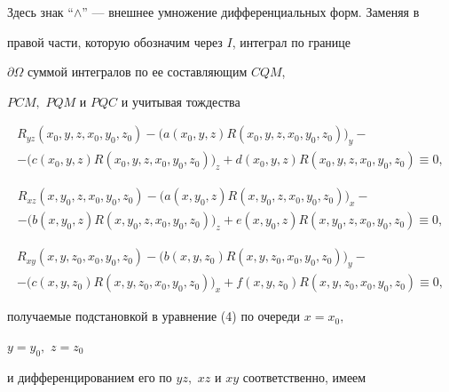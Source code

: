 \begin{pf}
Здесь знак ``$\wedge$'' --- внешнее умножение дифференциальных форм. Заменяя в


правой части, которую обозначим через $I$, интеграл по границе


$\partial\Omega$ суммой интегралов по ее составляющим $CQM$,


$PCM,$ $PQM$ и $PQC$ и учитывая тождества


\begin{multline*}


R_{yz}(x_{0},y,z,x_{0},y_{0},z_{0})-\bigl(


a(x_{0},y,z)R(x_{0},y,z,x_{0},y_{0},z_{0})\bigr)_{y}-\\


%


-\bigl( c(x_{0},y,z)R(x_{0},y,z,x_{0},y_{0},z_{0})\bigr)_{z}+


d(x_{0},y,z)R(x_{0},y,z,x_{0},y_{0},z_{0})\equiv 0,


\end{multline*}


\begin{multline*}


R_{xz}(x,y_{0},z,x_{0},y_{0},z_{0})-\bigl(


a(x,y_{0},z)R(x,y_{0},z,x_{0},y_{0},z_{0})\bigr)_{x}-\\


%


-\bigl( b(x,y_{0},z)R(x,y_{0},z,x_{0},y_{0},z_{0})\bigr)_{z}+


e(x,y_{0},z)R(x,y_{0},z,x_{0},y_{0},z_{0})\equiv 0,


\end{multline*}


\begin{multline*}


R_{xy}(x,y,z_{0},x_{0},y_{0},z_{0})-\bigl(


b(x,y,z_{0})R(x,y,z_{0},x_{0},y_{0},z_{0})\bigr)_{y}-\\


-\bigl( c(x,y,z_{0})R(x,y,z_{0},x_{0},y_{0},z_{0})\bigr)_{x}+


f(x,y,z_{0})R(x,y,z_{0},x_{0},y_{0},z_{0})\equiv 0,


\end{multline*}


получаемые подстановкой в уравнение (4) по очереди $x=x_{0},$


$y=y_{0},$ $z=z_{0}$


и дифференцированием его по $yz,$ $xz$ и $xy$ соответственно, имеем



\end{pf}
